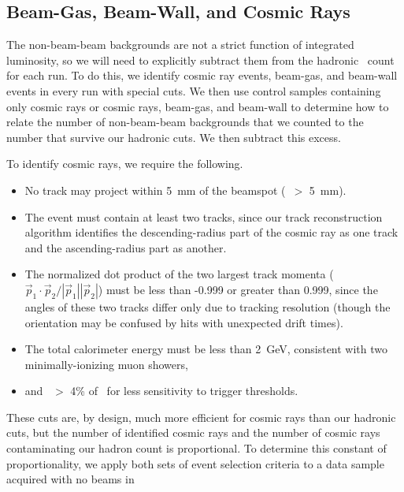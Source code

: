 \documentclass{cornell}
\begin{document}
\subsection{Beam-Gas, Beam-Wall, and Cosmic Rays}
\label{sec:bgbwcr}

The non-beam-beam backgrounds are not a strict function of integrated
luminosity, so we will need to explicitly subtract them from the
hadronic \ups\ count for each run.  To do this, we identify cosmic ray
events, beam-gas, and beam-wall events in every run with special cuts.
We then use control samples containing only cosmic rays or cosmic
rays, beam-gas, and beam-wall to determine how to relate the number of
non-beam-beam backgrounds that we counted to the number that survive
our hadronic cuts.  We then subtract this excess.

To identify cosmic rays, we require the following.
\begin{itemize}

  \item No track may project within 5~mm of the beamspot (\dxy\ $>$
    5~mm).

  \item The event must contain at least two tracks, since our track
    reconstruction algorithm identifies the descending-radius part of
    the cosmic ray as one track and the ascending-radius part as
    another.

  \item The normalized dot product of the two largest track momenta
    ($\vec{p}_1 \cdot \vec{p}_2 / |\vec{p}_1| |\vec{p}_2|$) must be
    less than -0.999 or greater than 0.999, since the angles of these
    two tracks differ only due to tracking resolution (though the
    orientation may be confused by hits with unexpected drift times).

  \item The total calorimeter energy must be less than 2~GeV,
    consistent with two minimally-ionizing muon showers,

  \item and \visen\ $>$ 4\% of \ecm\ for less sensitivity to trigger
    thresholds.

\end{itemize}
These cuts are, by design, much more efficient for cosmic rays than
our hadronic cuts, but the number of identified cosmic rays and the
number of cosmic rays contaminating our hadron count is proportional.
To determine this constant of proportionality, we apply both sets of
event selection criteria to a data sample acquired with no beams in
\end{document}

